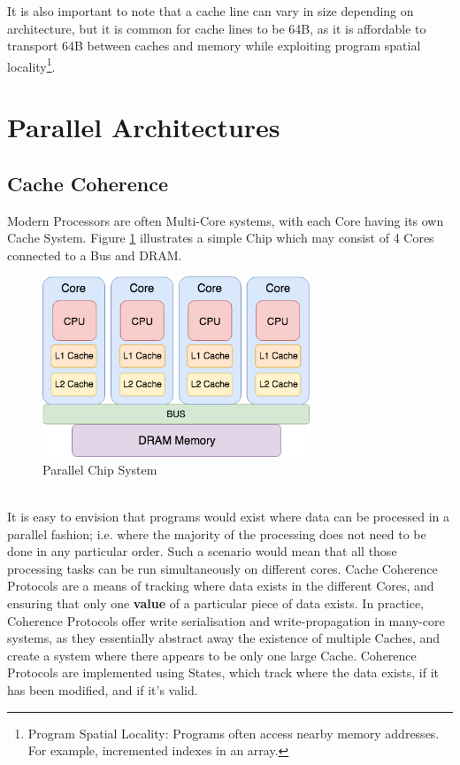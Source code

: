 \documentclass[bsc,frontabs,twoside,singlespacing,parskip,deptreport]{infthesis}     %
\begin{document}
It is also important to note that a cache line can vary in size depending on architecture, but it is common for cache lines to be 64B, as it is affordable to transport 64B between caches and memory while exploiting program spatial locality\footnote{Program Spatial Locality: Programs often access nearby memory addresses. For example, incremented indexes in an array.}.

\newpage

\section{Parallel Architectures}

\subsection{Cache Coherence}\label{cache-coherence}
Modern Processors are often Multi-Core systems, with each Core having its own Cache System. Figure \ref{fig:parallel-cpu} illustrates a simple Chip which may consist of 4 Cores connected to a Bus and DRAM. \\
\begin{figure}[!h]
    \centering
    \includegraphics[width=8cm]{Parallel.png}
    \caption{Parallel Chip System}
    \label{fig:parallel-cpu}
\end{figure} \\
It is easy to envision that programs would exist where data can be processed in a parallel fashion; i.e. where the majority of the processing does not need to be done in any particular order. Such a scenario would mean that all those processing tasks can be run simultaneously on different cores. Cache Coherence Protocols are a means of tracking where data exists in the different Cores, and ensuring that only one \textbf{value} of a particular piece of data exists. In practice, Coherence Protocols offer write serialisation and write-propagation in many-core systems, as they essentially abstract away the existence of multiple Caches, and create a system where there appears to be only one large Cache. Coherence Protocols are implemented using States, which track where the data exists, if it has been modified, and if it's valid.
\end{document}
